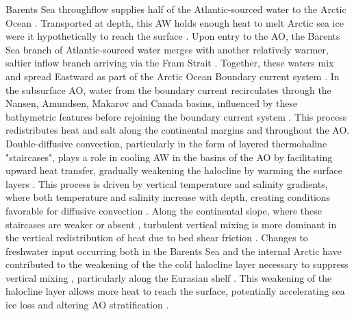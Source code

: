 \documentclass[draft]{agujournal2019}
\begin{document}
Barents Sea throughflow supplies half of the Atlantic-sourced water to the Arctic Ocean \cite{Lien_Trofimov_2013}. Transported at depth, this AW holds enough heat to melt Arctic sea ice were it hypothetically to reach the surface \cite{Polyakov2017,Stroeve2018,Grabon2021}. Upon entry to the AO, the Barents Sea branch of Atlantic-sourced water merges with another relatively warmer, saltier inflow branch arriving via the Fram Strait \cite{schauer1997,Lien_Trofimov_2013}. Together, these waters mix and spread Eastward as part of the Arctic Ocean Boundary current system \cite{schauer1997,Wang2020,Rudels2022}. In the subsurface AO, water from the boundary current recirculates through the Nansen, Amundsen, Makarov and Canada basins, influenced by these bathymetric features before rejoining the boundary current system \cite{Rudels2022}. This process redistributes heat and salt along the continental margins and throughout the AO. Double-diffusive convection, particularly in the form of layered thermohaline "staircases", plays a role in cooling AW in the basins of the AO by facilitating upward heat transfer, gradually weakening the halocline by warming the surface layers \cite{Timmermans2008,shibley2017spatial}. This process is driven by vertical temperature and salinity gradients, where both temperature and salinity increase with depth, creating conditions favorable for diffusive convection \cite{Rudels2008,polyakov2019}. Along the continental slope, where these staircases are weaker or absent \cite{shibley2017spatial}, turbulent vertical mixing is more dominant in the vertical redistribution of heat due to bed shear friction \cite{Rippeth2015,Polyakov2020,schulz2021}. Changes to freshwater input occurring both in the Barents Sea and the internal Arctic have contributed to the weakening of the the cold halocline layer necessary to suppress vertical mixing \cite{Fer2009}, particularly along the Eurasian shelf \cite{Pemberton2016,Polyakov2020,Metzner2020}. This weakening of the halocline layer allows more heat to reach the surface, potentially accelerating sea ice loss and altering AO stratification \cite{Polyakov2017,Polyakov2020}.



\end{document}

